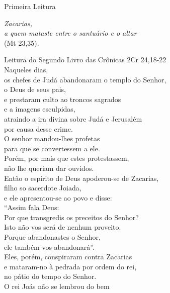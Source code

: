 \documentclass{book}
\begin{document}
\pagestyle{empty}
\begin{center}
    \textcolor{VioletRed1}{Primeira Leitura}
\end{center}
\begin{flushright}
    \textit{Zacarias,\\ a quem mataste entre o santuário e o altar}\\ \textcolor{VioletRed1}{(Mt 23,35).}
\end{flushright}
\begin{flushleft}
    \vspace{.2cm}
    Leitura do Segundo Livro das Crônicas
    \hspace{\fill}
    \textcolor{VioletRed1}{2Cr 24,18-22}
    \vspace{.2cm}\\
    Naqueles dias,\\
    os chefes de Judá abandonaram o templo do Senhor,\\
    o Deus de seus pais,\\
    e prestaram culto ao troncos sagrados\\
    e a imagens esculpidas,\\
    atraindo a ira divina sobre Judá e Jerusalém\\
    por causa desse crime.\\
    O senhor mandou-lhes profetas\\
    para que se convertessem a ele.\\
    Porém, por mais que estes protestassem,\\
    não lhe queriam dar ouvidos.\\
    Então o espírito de Deus apoderou-se de Zacarias,\\
    filho so sacerdote Joiada,\\
    e ele apresentou-se ao povo e disse:\\
    ``Assim fala Deus:\\
    Por que transgredis os preceitos do Senhor?\\
    Isto não vos será de nenhum proveito.\\
    Porque abandonastes o Senhor,\\
    ele também vos abandonará''.\\
    Eles, porém, conspiraram contra Zacarias\\
    e mataram-no à pedrada por ordem do rei,\\
    no pátio do tempo do Senhor.\\
    O rei Joás não se lembrou do bem\\

\end{flushleft}
\end{document}
